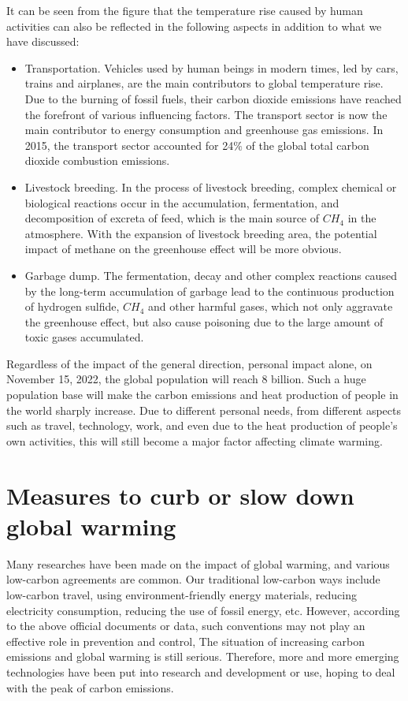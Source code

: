 \documentclass{apmcmthesis}
\begin{document}
It can be seen from the figure that the temperature rise caused by human activities can also be reflected in the following aspects in addition to what we have discussed:

\begin{itemize}
  \item Transportation. Vehicles used by human beings in modern times, led by cars, trains and airplanes, are the main contributors to global temperature rise. Due to the burning of fossil fuels, their carbon dioxide emissions have reached the forefront of various influencing factors. The transport sector is now the main contributor to energy consumption and greenhouse gas emissions. In 2015, the transport sector accounted for 24$\%$ of the global total carbon dioxide combustion emissions.
  \item Livestock breeding. In the process of livestock breeding, complex chemical or biological reactions occur in the accumulation, fermentation, and decomposition of excreta of feed, which is the main source of $CH_4$ in the atmosphere.  With the expansion of livestock breeding area, the potential impact of methane on the greenhouse effect will be more obvious.
  \item Garbage dump. The fermentation, decay and other complex reactions caused by the long-term accumulation of garbage lead to the continuous production of hydrogen sulfide, $CH_4$ and other harmful gases, which not only aggravate the greenhouse effect, but also cause poisoning due to the large amount of toxic gases accumulated.
\end{itemize}

Regardless of the impact of the general direction, personal impact alone, on November 15, 2022, the global population will reach 8 billion. Such a huge population base will make the carbon emissions and heat production of people in the world sharply increase. Due to different personal needs, from different aspects such as travel, technology, work, and even due to the heat production of people's own activities, this will still become a major factor affecting climate warming.

\section{Measures to curb or slow down global warming}
Many researches have been made on the impact of global warming, and various low-carbon agreements are common. Our traditional low-carbon ways include low-carbon travel, using environment-friendly energy materials, reducing electricity consumption, reducing the use of fossil energy, etc. However, according to the above official documents or data, such conventions may not play an effective role in prevention and control, The situation of increasing carbon emissions and global warming is still serious. Therefore, more and more emerging technologies have been put into research and development or use, hoping to deal with the peak of carbon emissions.
\end{document}
